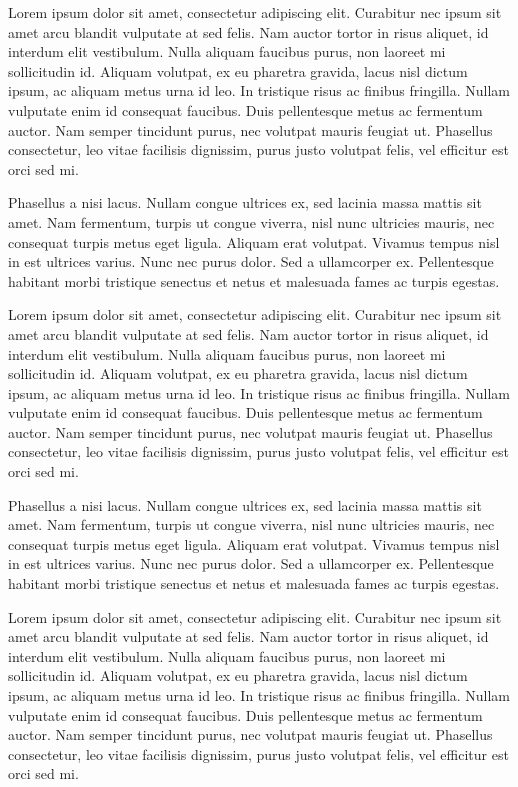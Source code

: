 \documentclass[
  letterpaper,
  DIV=11,
  numbers=noendperiod]{scrreprt}
\begin{document}
Lorem ipsum dolor sit amet, consectetur adipiscing elit. Curabitur nec
ipsum sit amet arcu blandit vulputate at sed felis. Nam auctor tortor in
risus aliquet, id interdum elit vestibulum. Nulla aliquam faucibus
purus, non laoreet mi sollicitudin id. Aliquam volutpat, ex eu pharetra
gravida, lacus nisl dictum ipsum, ac aliquam metus urna id leo. In
tristique risus ac finibus fringilla. Nullam vulputate enim id consequat
faucibus. Duis pellentesque metus ac fermentum auctor. Nam semper
tincidunt purus, nec volutpat mauris feugiat ut. Phasellus consectetur,
leo vitae facilisis dignissim, purus justo volutpat felis, vel efficitur
est orci sed mi.

Phasellus a nisi lacus. Nullam congue ultrices ex, sed lacinia massa
mattis sit amet. Nam fermentum, turpis ut congue viverra, nisl nunc
ultricies mauris, nec consequat turpis metus eget ligula. Aliquam erat
volutpat. Vivamus tempus nisl in est ultrices varius. Nunc nec purus
dolor. Sed a ullamcorper ex. Pellentesque habitant morbi tristique
senectus et netus et malesuada fames ac turpis egestas.

Lorem ipsum dolor sit amet, consectetur adipiscing elit. Curabitur nec
ipsum sit amet arcu blandit vulputate at sed felis. Nam auctor tortor in
risus aliquet, id interdum elit vestibulum. Nulla aliquam faucibus
purus, non laoreet mi sollicitudin id. Aliquam volutpat, ex eu pharetra
gravida, lacus nisl dictum ipsum, ac aliquam metus urna id leo. In
tristique risus ac finibus fringilla. Nullam vulputate enim id consequat
faucibus. Duis pellentesque metus ac fermentum auctor. Nam semper
tincidunt purus, nec volutpat mauris feugiat ut. Phasellus consectetur,
leo vitae facilisis dignissim, purus justo volutpat felis, vel efficitur
est orci sed mi.

Phasellus a nisi lacus. Nullam congue ultrices ex, sed lacinia massa
mattis sit amet. Nam fermentum, turpis ut congue viverra, nisl nunc
ultricies mauris, nec consequat turpis metus eget ligula. Aliquam erat
volutpat. Vivamus tempus nisl in est ultrices varius. Nunc nec purus
dolor. Sed a ullamcorper ex. Pellentesque habitant morbi tristique
senectus et netus et malesuada fames ac turpis egestas.

Lorem ipsum dolor sit amet, consectetur adipiscing elit. Curabitur nec
ipsum sit amet arcu blandit vulputate at sed felis. Nam auctor tortor in
risus aliquet, id interdum elit vestibulum. Nulla aliquam faucibus
purus, non laoreet mi sollicitudin id. Aliquam volutpat, ex eu pharetra
gravida, lacus nisl dictum ipsum, ac aliquam metus urna id leo. In
tristique risus ac finibus fringilla. Nullam vulputate enim id consequat
faucibus. Duis pellentesque metus ac fermentum auctor. Nam semper
tincidunt purus, nec volutpat mauris feugiat ut. Phasellus consectetur,
leo vitae facilisis dignissim, purus justo volutpat felis, vel efficitur
est orci sed mi.
\end{document}
